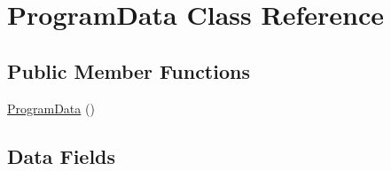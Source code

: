 \hypertarget{class_program_data}{}\section{Program\+Data Class Reference}
\label{class_program_data}
\subsection*{Public Member Functions}
\begin{DoxyCompactItemize}
\item 
\hyperlink{class_program_data_aac0984ace7ba84d571e5d3e590864b61}{Program\+Data} ()
\end{DoxyCompactItemize}
\subsection*{Data Fields}
